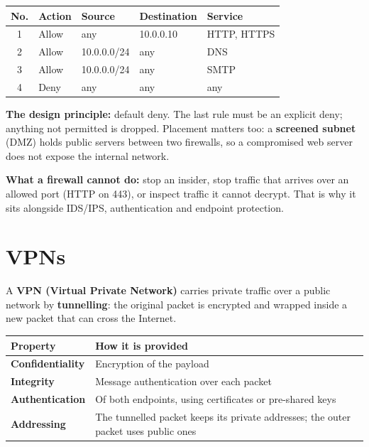 \documentclass[11pt,a4paper]{article}
\begin{document}
\begin{solbox}
\begin{center}\small
\begin{tabular}{c l l l l}
\toprule No. & Action & Source & Destination & Service\\
\midrule
1 & Allow & any & 10.0.0.10 & HTTP, HTTPS\\
2 & Allow & 10.0.0.0/24 & any & DNS\\
3 & Allow & 10.0.0.0/24 & any & SMTP\\
4 & Deny & any & any & any\\
\bottomrule
\end{tabular}
\end{center}

\textbf{The design principle:} default deny. The last rule must be an explicit deny; anything not permitted is dropped. Placement matters too: a \textbf{screened subnet} (DMZ) holds public servers between two firewalls, so a compromised web server does not expose the internal network.

\textbf{What a firewall cannot do:} stop an insider, stop traffic that arrives over an allowed port (HTTP on 443), or inspect traffic it cannot decrypt. That is why it sits alongside IDS/IPS, authentication and endpoint protection.
\end{solbox}

\section{VPNs}

A \textbf{VPN (Virtual Private Network)} carries private traffic over a public network by \textbf{tunnelling}: the original packet is encrypted and wrapped inside a new packet that can cross the Internet.

\begin{center}\small
\begin{tabularx}{\textwidth}{>{\bfseries}p{} X}
\toprule Property & How it is provided\\
\midrule
Confidentiality & Encryption of the payload\\
Integrity & Message authentication over each packet\\
Authentication & Of both endpoints, using certificates or pre-shared keys\\
Addressing & The tunnelled packet keeps its private addresses; the outer packet uses public ones\\
\bottomrule
\end{tabularx}
\end{center}
\end{document}
